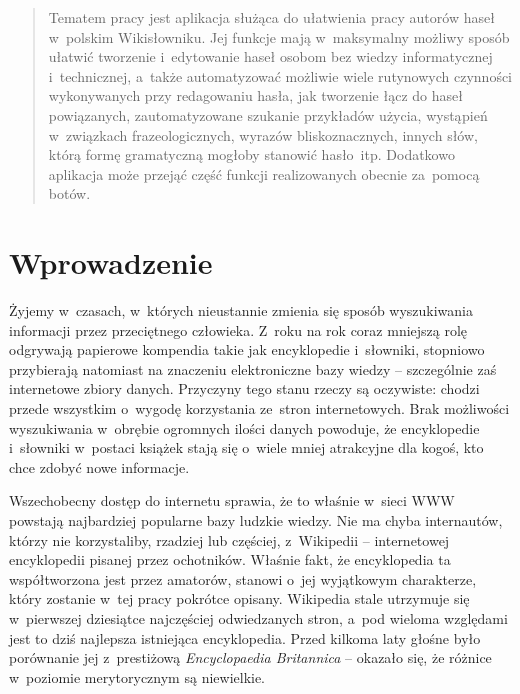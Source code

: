 \documentclass{pracamgr}
\begin{document}
\maketitle

\begin{abstract}
  Tematem pracy jest aplikacja służąca do ułatwienia pracy autorów haseł w~polskim Wikisłowniku. Jej funkcje mają w~maksymalny możliwy sposób ułatwić tworzenie i~edytowanie haseł osobom bez wiedzy informatycznej i~technicznej, a~także automatyzować możliwie wiele rutynowych czynności wykonywanych przy redagowaniu hasła, jak tworzenie łącz do haseł powiązanych, zautomatyzowane szukanie przykładów użycia, wystąpień w~związkach frazeologicznych, wyrazów bliskoznacznych, innych słów, którą formę gramatyczną mogłoby stanowić hasło~itp. Dodatkowo aplikacja może przejąć część funkcji realizowanych obecnie za~pomocą botów.
\end{abstract}

\tableofcontents

\chapter{Wprowadzenie}
Żyjemy w~czasach, w~których nieustannie zmienia się sposób wyszukiwania informacji przez przeciętnego człowieka. Z~roku na rok coraz mniejszą rolę odgrywają papierowe kompendia takie jak encyklopedie i~słowniki, stopniowo przybierają natomiast na znaczeniu elektroniczne bazy wiedzy -- szczególnie zaś internetowe zbiory danych. Przyczyny tego stanu rzeczy są oczywiste: chodzi przede wszystkim o~wygodę korzystania ze~stron internetowych. Brak możliwości wyszukiwania w~obrębie ogromnych ilości danych powoduje, że encyklopedie i~słowniki w~postaci książek stają się o~wiele mniej atrakcyjne dla kogoś, kto chce zdobyć nowe informacje.

Wszechobecny dostęp do internetu sprawia, że to właśnie w~sieci WWW powstają najbardziej popularne bazy ludzkie wiedzy. Nie ma chyba internautów, którzy nie korzystaliby, rzadziej lub częściej, z~Wikipedii -- internetowej encyklopedii pisanej przez ochotników. Właśnie fakt, że encyklopedia ta współtworzona jest przez amatorów, stanowi o~jej wyjątkowym charakterze, który zostanie w~tej pracy pokrótce opisany. Wikipedia stale utrzymuje się w~pierwszej dziesiątce najczęściej odwiedzanych stron, a~pod wieloma względami jest to dziś najlepsza istniejąca encyklopedia. Przed kilkoma laty głośne było porównanie jej z~prestiżową \emph{Encyclopaedia Britannica} -- okazało się, że różnice w~poziomie merytorycznym są niewielkie.
\end{document}
